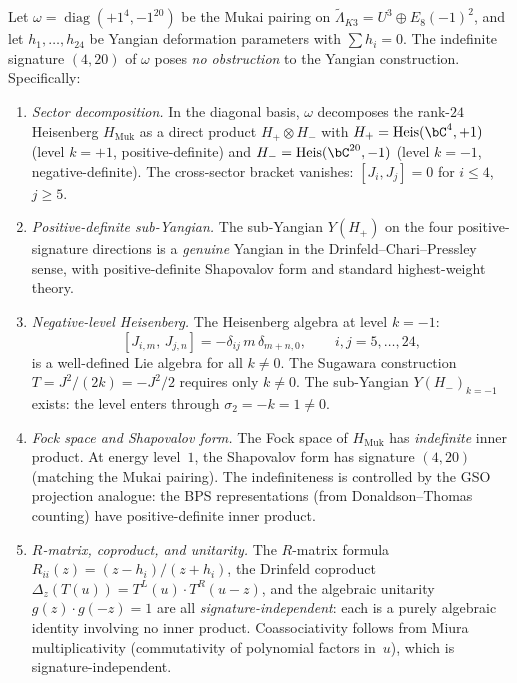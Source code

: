 \begin{proposition}
\label{prop:mukai-indefinite-yangian}
\ClaimStatusProvedHere
Let $\omega = \operatorname{diag}(+1^4, -1^{20})$ be the Mukai pairing
on $\widetilde{\Lambda}_{K3} = U^3 \oplus E_8(-1)^2$,
and let $h_1, \ldots, h_{24}$ be Yangian deformation parameters with
$\sum h_i = 0$.  The indefinite signature $(4,20)$ of $\omega$ poses
\emph{no obstruction} to the Yangian construction.  Specifically:
\begin{enumerate}[label=\textup{(\roman*)}]

\item \emph{Sector decomposition.}
In the diagonal basis, $\omega$ decomposes the rank-$24$ Heisenberg
$H_{\mathrm{Muk}}$ as a direct product
$H_+ \otimes H_-$ with $H_+ = \mathrm{Heis}(\bC^4, +1)$ (level $k=+1$,
positive-definite) and
$H_- = \mathrm{Heis}(\bC^{20}, -1)$ (level $k=-1$, negative-definite).
The cross-sector bracket vanishes: $[J_i, J_j] = 0$ for $i \leq 4$,
$j \geq 5$.

\item \emph{Positive-definite sub-Yangian.}
The sub-Yangian $Y(H_+)$ on the four positive-signature directions
is a \emph{genuine} Yangian in the Drinfeld--Chari--Pressley sense,
with positive-definite Shapovalov form and standard highest-weight theory.

\item \emph{Negative-level Heisenberg.}
The Heisenberg algebra at level $k = -1$:
\[
  [J_{i,m},\, J_{j,n}] = -\delta_{ij}\, m\, \delta_{m+n,0},
  \qquad i,j = 5, \ldots, 24,
\]
is a well-defined Lie algebra for all $k \neq 0$.
The Sugawara construction
$T = J^2/(2k) = -J^2/2$ requires only $k \neq 0$.
The sub-Yangian $Y(H_-)_{k=-1}$ exists: the level enters
through $\sigma_2 = -k = 1 \neq 0$.

\item \emph{Fock space and Shapovalov form.}
The Fock space of $H_{\mathrm{Muk}}$ has \emph{indefinite}
inner product.  At energy level~$1$, the Shapovalov form has
signature $(4, 20)$ (matching the Mukai pairing).
The indefiniteness is controlled by the GSO projection
analogue: the BPS representations (from Donaldson--Thomas
counting) have positive-definite inner product.

\item \emph{$R$-matrix, coproduct, and unitarity.}
The $R$-matrix formula $R_{ii}(z) = (z - h_i)/(z + h_i)$,
the Drinfeld coproduct $\Delta_z(T(u)) = T^L(u) \cdot T^R(u-z)$,
and the algebraic unitarity $g(z) \cdot g(-z) = 1$ are all
\emph{signature-independent}: each is a purely algebraic
identity involving no inner product.
Coassociativity follows from Miura multiplicativity (commutativity
of polynomial factors in~$u$), which is signature-independent.


\end{enumerate}
\end{proposition}

